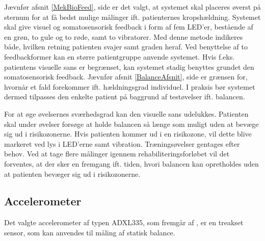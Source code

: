 Jævnfør afsnit \ref{MekBioFeed}, side \pageref{MekBioFeed} er det valgt, at systemet skal placeres øverst på sternum for at få bedst mulige målinger ift. patienternes kropshældning. Systemet skal give visuel og somatosensorisk feedback i form af fem LED'er, bestående af en grøn, to gule og to røde, samt to vibratorer. Med denne metode indikeres både, hvilken retning patienten svajer samt graden heraf. Ved benyttelse af to feedbackformer kan en større patientgruppe anvende systemet. Hvis f.eks. patientens visuelle sans er begrænset, kan systemet stadig benyttes grundet den somatosensorisk feedback. Jævnfør afsnit \ref{BalanceAfsnit}, side \pageref{BalanceAfsnit} er grænsen for, hvornår et fald forekommer ift. hældningsgrad individuel. I praksis bør systemet dermed tilpasses den enkelte patient på baggrund af testøvelser ift. balancen. %


For at øge øvelsernes sværhedsgrad kan den visuelle sans udelukkes. Patienten skal under øvelser forsøge at holde balancen så længe som muligt uden at bevæge sig ud i risikozonerne. Hvis patienten kommer ud i en risikozone, vil dette blive markeret ved lys i LED'erne samt vibration. Træningsøvelser gentages efter behov. Ved at tage flere målinger igennem rehabiliteringsforløbet vil det forventes, at der sker en fremgang ift. tiden, hvori balancen kan opretholdes uden at patienten bevæger sig ud i risikozonerne. 

\subsection{Accelerometer}\label{Subsec:AccTeori}
Det valgte accelerometer af typen ADXL335, som fremgår af , er en treakset sensor, som kan anvendes til måling af statisk balance. 

